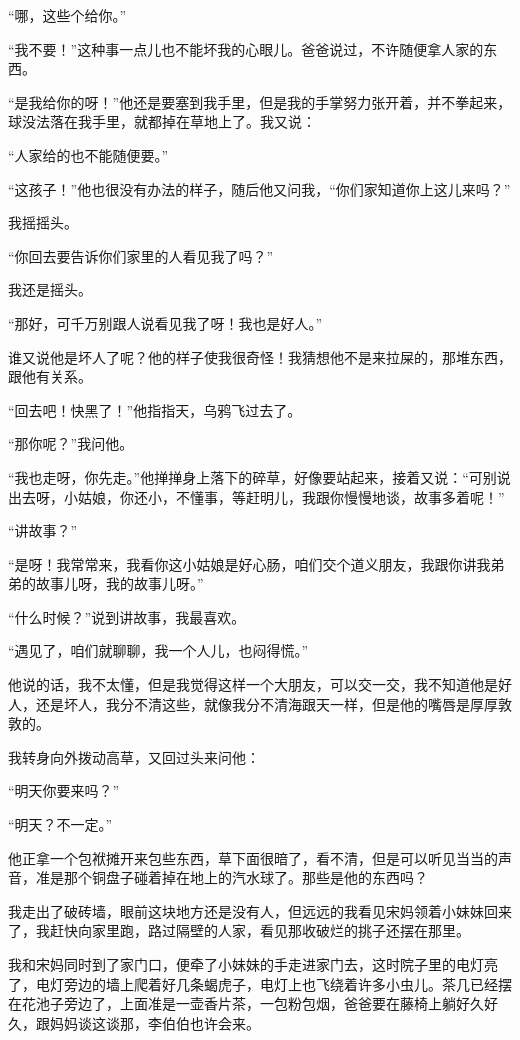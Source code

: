 \par “哪，这些个给你。”
\par “我不要！”这种事一点儿也不能坏我的心眼儿。爸爸说过，不许随便拿人家的东西。
\par “是我给你的呀！”他还是要塞到我手里，但是我的手掌努力张开着，并不拳起来，球没法落在我手里，就都掉在草地上了。我又说：
\par “人家给的也不能随便要。”
\par “这孩子！”他也很没有办法的样子，随后他又问我，“你们家知道你上这儿来吗？”
\par 我摇摇头。
\par “你回去要告诉你们家里的人看见我了吗？”
\par 我还是摇头。
\par “那好，可千万别跟人说看见我了呀！我也是好人。”
\par 谁又说他是坏人了呢？他的样子使我很奇怪！我猜想他不是来拉屎的，那堆东西，跟他有关系。
\par “回去吧！快黑了！”他指指天，乌鸦飞过去了。
\par “那你呢？”我问他。
\par “我也走呀，你先走。”他掸掸身上落下的碎草，好像要站起来，接着又说：“可别说出去呀，小姑娘，你还小，不懂事，等赶明儿，我跟你慢慢地谈，故事多着呢！”
\par “讲故事？”
\par “是呀！我常常来，我看你这小姑娘是好心肠，咱们交个道义朋友，我跟你讲我弟弟的故事儿呀，我的故事儿呀。”
\par “什么时候？”说到讲故事，我最喜欢。
\par “遇见了，咱们就聊聊，我一个人儿，也闷得慌。”
\par 他说的话，我不太懂，但是我觉得这样一个大朋友，可以交一交，我不知道他是好人，还是坏人，我分不清这些，就像我分不清海跟天一样，但是他的嘴唇是厚厚敦敦的。
\par 我转身向外拨动高草，又回过头来问他：
\par “明天你要来吗？”
\par “明天？不一定。”
\par 他正拿一个包袱摊开来包些东西，草下面很暗了，看不清，但是可以听见当当的声音，准是那个铜盘子碰着掉在地上的汽水球了。那些是他的东西吗？
\par 我走出了破砖墙，眼前这块地方还是没有人，但远远的我看见宋妈领着小妹妹回来了，我赶快向家里跑，路过隔壁的人家，看见那收破烂的挑子还摆在那里。
\par 我和宋妈同时到了家门口，便牵了小妹妹的手走进家门去，这时院子里的电灯亮了，电灯旁边的墙上爬着好几条蝎虎子，电灯上也飞绕着许多小虫儿。茶几已经摆在花池子旁边了，上面准是一壶香片茶，一包粉包烟，爸爸要在藤椅上躺好久好久，跟妈妈谈这谈那，李伯伯也许会来。
